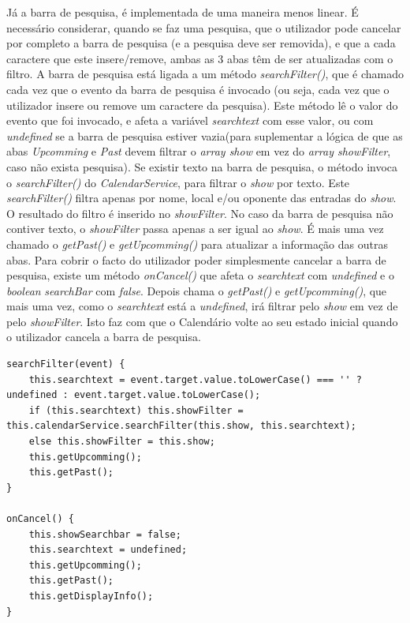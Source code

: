 Já a barra de pesquisa, é implementada de uma maneira menos linear. É necessário considerar, quando se faz uma pesquisa, que o utilizador pode cancelar por completo a barra de pesquisa (e a pesquisa deve ser removida), e que a cada caractere que este insere/remove, ambas as 3 abas têm de ser atualizadas com o filtro.
A barra de pesquisa está ligada a um método \textit{searchFilter()}, que é chamado cada vez que o evento da barra de pesquisa é invocado (ou seja, cada vez que o utilizador insere ou remove um caractere da pesquisa). Este método lê o valor do evento que foi invocado, e afeta a variável \textit{searchtext} com esse valor, ou com \textit{undefined} se a barra de pesquisa estiver vazia(para suplementar a lógica de que as abas \textit{Upcomming} e \textit{Past} devem filtrar o \textit{array show} em vez do \textit{array showFilter}, caso não exista pesquisa). Se existir texto na barra de pesquisa, o método invoca o \textit{searchFilter()} do \textit{CalendarService}, para filtrar o \textit{show} por texto. Este \textit{searchFilter()} filtra apenas por nome, local e/ou oponente das entradas do \textit{show}. O resultado do filtro é inserido no \textit{showFilter}. No caso da barra de pesquisa não contiver texto, o \textit{showFilter} passa apenas a ser igual ao \textit{show}. É mais uma vez chamado o \textit{getPast()} e \textit{getUpcomming()} para atualizar a informação das outras abas. Para cobrir o facto do utilizador poder simplesmente cancelar a barra de pesquisa, existe um método \textit{onCancel()} que afeta o \textit{searchtext} com \textit{undefined} e o \textit{boolean} \textit{searchBar} com \textit{false}. Depois chama o \textit{getPast()} e \textit{getUpcomming()}, que mais uma vez, como o \textit{searchtext} está a \textit{undefined}, irá filtrar pelo \textit{show} em vez de pelo \textit{showFilter}. Isto faz com que o Calendário volte ao seu estado inicial quando o utilizador cancela a barra de pesquisa.

\begin{lstlisting}
searchFilter(event) {
	this.searchtext = event.target.value.toLowerCase() === '' ? undefined : event.target.value.toLowerCase();
	if (this.searchtext) this.showFilter = this.calendarService.searchFilter(this.show, this.searchtext);
	else this.showFilter = this.show;
	this.getUpcomming();
	this.getPast();
}

onCancel() {
	this.showSearchbar = false;
	this.searchtext = undefined;
	this.getUpcomming();
	this.getPast();
	this.getDisplayInfo();
}
\end{lstlisting}


